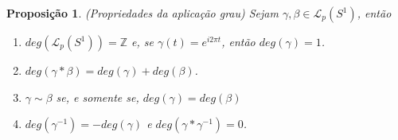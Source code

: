 \documentclass[12pt]{book}
\newtheorem{proposicao}[teorema]{Proposição}
\newcommand{\caminhos}{\mathcal{L}}
\newcommand{\caminhospontobasegeral}[2]{\caminhos_{#1}(#2)}
\newcommand{\circulo}{S^{1}}
\newcommand{\inteiros}{\mathbb{Z}}
\begin{document}
	\begin{proposicao}\label{proposicao_grau_aplicacao}
		(Propriedades da aplicação grau) Sejam $\gamma, \beta \in \caminhospontobasegeral{p}{\circulo}$, então
		\begin{enumerate}
			\item $deg(\caminhospontobasegeral{p}{\circulo}) = \inteiros$ e, se $\gamma(t) = e^{i2\pi t}$, então $deg(\gamma) = 1$.
			
			\item $deg(\gamma*\beta)=deg(\gamma)+deg(\beta)$.
			
			\item $\gamma\sim \beta$ se, e somente se, $deg(\gamma)=deg(\beta)$
			
			
			\item $deg(\gamma^{-1}) = -deg(\gamma)$ e $deg(\gamma*\gamma^{-1}) = 0$.
			
		\end{enumerate}
	\end{proposicao}
\end{document}
